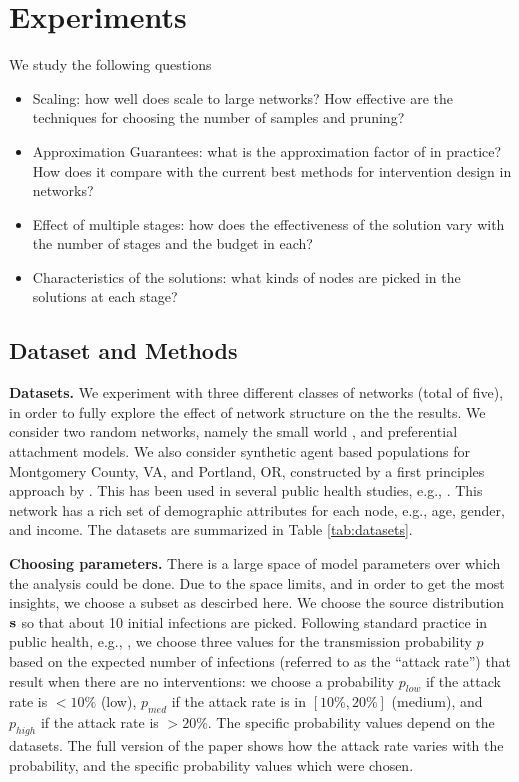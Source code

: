 \section{Experiments}
\label{sec:experiments}

We study the following questions
\begin{itemize}
\item
Scaling: how well does \algo{} scale to large networks? How effective are the techniques for choosing the
number of samples and pruning?
\item
Approximation Guarantees: what is the approximation factor of \algo{} in practice? How does it compare with 
the current best methods for intervention design in networks?
\item
Effect of multiple stages: how does the effectiveness of the solution vary with the number of stages
and the budget in each?
\item
Characteristics of the solutions: what kinds of nodes are picked in the solutions at each stage?
\end{itemize}

\subsection{Dataset and Methods}

\noindent
\textbf{Datasets.}
We experiment with three different classes of networks (total of five),
in order to fully explore the effect of network structure on the the results. 
We consider two random networks, namely the small world 
\cite{Kleinberg00thesmall-world}, and preferential attachment \cite{Barabasi509} models. 
We also consider synthetic agent based populations for Montgomery County, VA, and Portland, OR,
constructed by a first principles approach by \cite{barrett:wsc09,eubank:nature04}. This has been used in several public health studies, e.g., \cite{singh:bmc19}. This network has a rich set of demographic attributes for each node, e.g., age, gender, and income.
The datasets are summarized in Table \ref{tab:datasets}.

\noindent
\textbf{Choosing parameters.}
There is a large space of model parameters over which the analysis could be done. Due to the space limits, and
in order to get the most insights, we choose a subset as descirbed here.
We choose the source distribution $\mathbf{s}$ so that about 10 initial infections are picked.
Following standard practice in public health, e.g., \cite{halloran:pnas08},
we choose three values for the transmission probability $p$ based on the expected number of infections (referred to as the ``attack rate'') 
that result when there are no interventions: we choose a probability $p_{low}$ if the attack rate is $<10\%$ (low),
$p_{med}$ if the attack rate is in $[10\%, 20\%]$ (medium), and
$p_{high}$ if the attack rate is $> 20\%$.
The specific probability values depend on the datasets.
The full version of the paper \cite{fullversion} shows how the attack rate varies with the probability,
and the specific probability values which were chosen.



